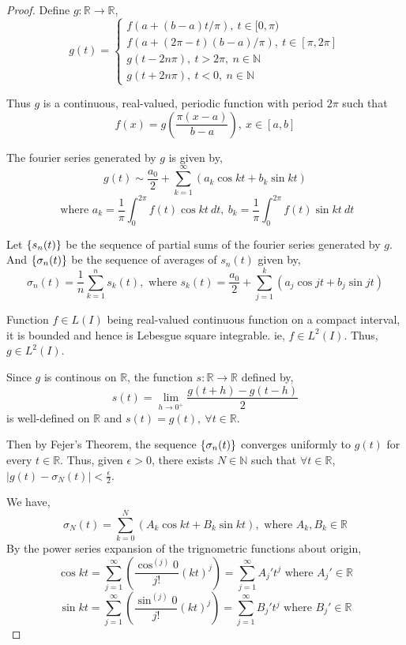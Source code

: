\begin{proof}
Define \(g : \mathbb{R} \to \mathbb{R}\), \[ g(t) = \begin{cases} f(a+(b-a)t/\pi),\ t \in [0,\pi) \\ f(a+(2\pi-t)(b-a)/\pi),\ t \in [\pi,2\pi] \\ g(t - 2n\pi),\ t > 2\pi,\ n \in \mathbb{N} \\ g(t+2n\pi),\ t < 0,\ n \in \mathbb{N} \end{cases}\]

Thus $g$ is a continuous, real-valued, periodic function with period $2\pi$ such that
\begin{equation}
	f(x) = g\left(\frac{\pi (x-a)}{b-a}\right),\ x \in [a,b] \label{equ:fx}
\end{equation}

The fourier series generated by $g$ is given by, \[ g(t) \sim \frac{a_0}{2} + \sum_{k=1}^\infty \left( a_k \cos kt + b_k \sin kt \right)\] \[ \text{ where } a_k = \frac{1}{\pi} \int_0^{2\pi} f(t) \cos kt\ dt,\ b_k = \frac{1}{\pi} \int_0^{2\pi} f(t) \sin kt\ dt\]

Let \(\{s_n(t)\}\) be the sequence of partial sums of the fourier series generated by $g$.
And \( \{\sigma_n(t)\}\)  be the sequence of averages of $s_n(t)$ given by, \[\sigma_n(t) = \frac{1}{n} \sum_{k = 1}^n s_k(t),\text{ where } s_k(t) = \frac{a_0}{2} + \sum_{j = 1}^k \left( a_j \cos jt + b_j \sin jt \right)\]

Function \(f \in L(I)\) being real-valued continuous function on a compact interval, it is bounded and hence is Lebesgue square integrable. ie, \(f \in L^2(I)\).
Thus, \(g \in L^2(I)\).

Since $g$ is continous on $\mathbb{R}$, the function \(s : \mathbb{R} \to \mathbb{R}\) defined by, \[ s(t) = \lim_{h \to 0^+} \frac{g(t+h)-g(t-h)}{2} \] is well-defined on $\mathbb{R}$ and \(s(t) = g(t),\ \forall t \in \mathbb{R}\).

Then by Fejer's Theorem, the sequence \(\{\sigma_n(t)\}\) converges uniformly to $g(t)$ for every \(t \in \mathbb{R}\).
Thus, given \(\epsilon > 0\), there exists \(N \in \mathbb{N}\) such that \(\forall t \in \mathbb{R}\), \(|g(t)-\sigma_N(t)| < \frac{\epsilon}{2}\).

We have,
\begin{equation}
	\sigma_N(t) = \sum_{k=0}^N \left(A_k \cos kt + B_k \sin kt \right),\text{ where } A_k, B_k \in \mathbb{R}
	\label{equ:sigmaN}
\end{equation}
By the power series expansion of the trignometric functions about origin,
\begin{equation}
	\cos kt = \sum_{j = 1}^\infty \left(\frac{\cos^{(j)} 0}{j!} (kt)^j \right)  = \sum_{j = 1}^\infty A_j' t^j \text{ where } A_j' \in \mathbb{R}
	\label{equ:coskt}
\end{equation}
\begin{equation}
	\sin kt = \sum_{j = 1}^\infty \left(\frac{\sin^{(j)} 0}{j!} (kt)^j \right)  = \sum_{j = 1}^\infty B_j' t^j \text{ where } B_j' \in \mathbb{R}
	\label{equ:sinkt}
\end{equation}


\end{proof}
